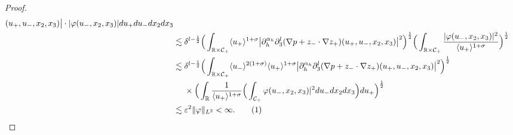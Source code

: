 \documentclass[10pt,reqno]{amsart}
\numberwithin{equation}{section}
\begin{document}
\begin{proof}
\begin{align*}
		(u_+,u_-,x_2,x_3)\big|\cdot|\varphi(u_-,x_2,x_3)|du_+du_-dx_2dx_3\\
		&\lesssim
		\delta^{l-\frac{1}{2}}\Big(\int_{\mathbb{R}\times \mathcal{C}_+}\langle  u_+\rangle^{1+\sigma}\big|\partial_h^{\alpha_h}\partial_3^l(\nabla p+z_{-}\cdot\nabla z_{+}) 
		(u_+,u_-,x_2,x_3)\big|^2 \Big)^{\frac{1}{2}}
		\Big(\int_{\mathbb{R}\times \mathcal{C}_+}\frac{|\varphi(u_-,x_2,x_3)|^2}{\langle u_+\rangle^{1+\sigma}}\Big)^{\frac{1}{2}}\\
		&\lesssim\delta^{l-\frac{1}{2}}\Big(\int_{\mathbb{R}\times \mathcal{C}_+}\langle u_-\rangle^{2(1+\sigma)}\langle u_+\rangle^{1+\sigma}\big|\partial_h^{\alpha_h}\partial_3^l(\nabla p+z_{-}\cdot\nabla z_{+}) (u_+,u_-,x_2,x_3)\big|^2\Big)^{\frac{1}{2}}\\
		&\ \ \ \ \times \Big(\int_{\mathbb{R}}\frac{1}{\langle u_+\rangle^{1+\sigma}}\Big(\int_{\mathcal{C}_+} \varphi(u_-,x_2,x_3)|^2  du_-dx_2dx_3 \Big)du_+\Big)^{\frac{1}{2}}\\
		&\lesssim\varepsilon^2\|\varphi\|_{L^2}<\infty.\stepcounter{equation}\tag{\theequation}\label{eq:lemma1-25}
	\end{align*}
    

\end{proof}
\end{document}

